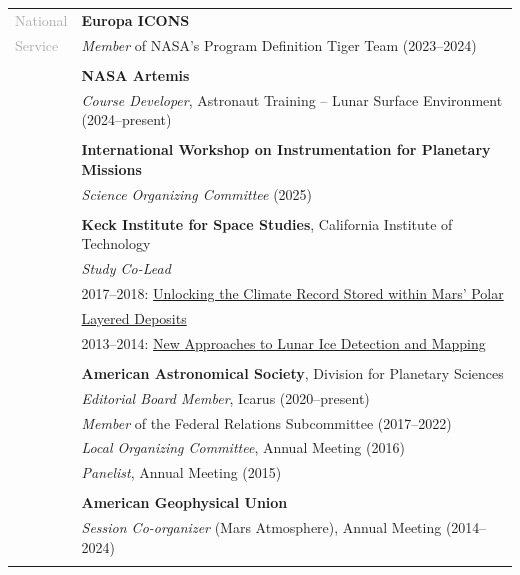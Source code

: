 \documentclass[letterpaper,10pt,twoside]{article}
\begin{document}
\noindent \begin{tabular}{@{} l l}
\large{\textcolor{darkgray}{National}} & \textbf{Europa ICONS}\\
\large{\textcolor{darkgray}{Service}} & \textit{Member} of NASA's Program Definition Tiger Team (2023--2024)\\
 & \\
 & \textbf{NASA Artemis}\\
 & \textit{Course Developer}, Astronaut Training -- Lunar Surface Environment (2024--present) \\
 & \\
 & \textbf{International Workshop on Instrumentation for Planetary Missions}\\
 & \textit{Science Organizing Committee} (2025) \\
 & \\
 & \textbf{Keck Institute for Space Studies}, California Institute of Technology \\
 & \textit{Study Co-Lead}\\
 & \hspace{0.25in} 2017--2018: \href{http://kiss.caltech.edu/workshops/polar/polar.html}{Unlocking the Climate Record Stored within Mars' Polar}\\
 & \hspace{0.99in} \href{http://kiss.caltech.edu/workshops/polar/polar.html}{Layered Deposits} \\
 & \hspace{0.25in} 2013--2014: \href{http://kiss.caltech.edu/workshops/lunar_ice/lunar_ice.html}{New Approaches to Lunar Ice Detection and Mapping} \\
 & \\
 & \textbf{American Astronomical Society}, Division for Planetary Sciences \\
 & \textit{Editorial Board Member}, Icarus (2020--present)\\
 & \textit{Member} of the Federal Relations Subcommittee (2017--2022)\\
 & \textit{Local Organizing Committee}, Annual Meeting (2016) \\
 & \textit{Panelist}, Annual Meeting (2015) \\
 & \\
 & \textbf{American Geophysical Union} \\
 & \textit{Session Co-organizer} (Mars Atmosphere), Annual Meeting (2014--2024) \\
 & \\

\end{tabular}
\end{document}
